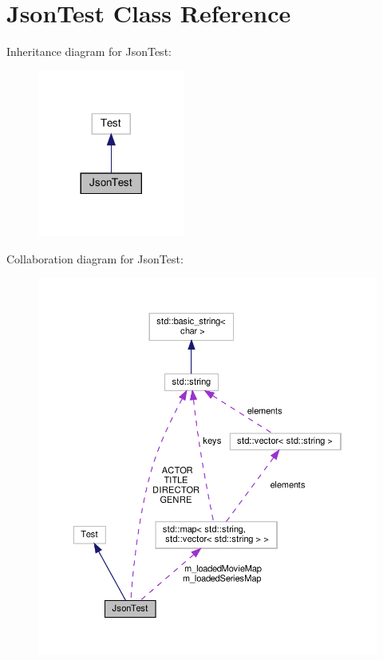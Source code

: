 \hypertarget{classJsonTest}{}\section{Json\+Test Class Reference}
\label{classJsonTest}


Inheritance diagram for Json\+Test\+:\nopagebreak
\begin{figure}[H]
\begin{center}
\leavevmode
\includegraphics[width=137pt]{classJsonTest__inherit__graph}
\end{center}
\end{figure}


Collaboration diagram for Json\+Test\+:\nopagebreak
\begin{figure}[H]
\begin{center}
\leavevmode
\includegraphics[width=350pt]{classJsonTest__coll__graph}
\end{center}
\end{figure}
